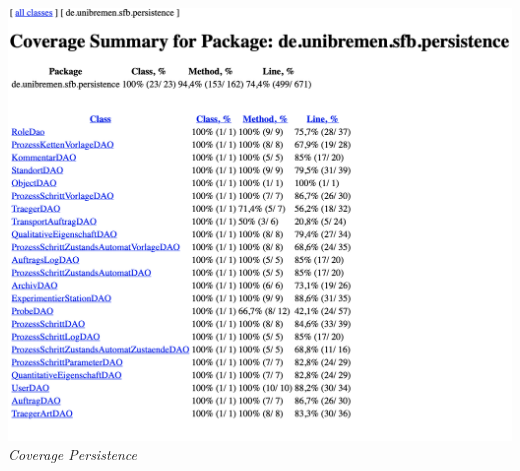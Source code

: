 \documentclass[enabledeprecatedfontcommands,fontsize=12pt,paper=a4,twoside]{scrartcl}
\begin{document}
 \hypertarget{3.4.1.4}{
\includegraphics[width=1\textwidth]{Screenshots/persistence.png}
\textit{ Coverage Persistence}
} \\
\end{document}
